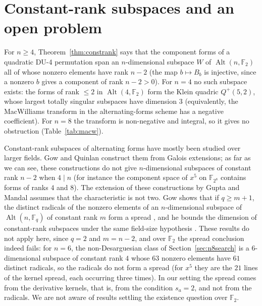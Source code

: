 \documentclass[11pt]{article}
\theoremstyle{definition}
\newcommand{\F}{\mathbb{F}}
\DeclareMathOperator{\Alt}{Alt}
\begin{document}
\section{Constant-rank subspaces and an open problem}\label{sec:constrank}
For $n\ge 4$, Theorem~\ref{thm:constrank} says that the component forms of a quadratic DU-4
permutation span an $n$-dimensional subspace $W$ of $\Alt(n,\F_2)$ all of whose nonzero
elements have rank $n-2$ (the map $b\mapsto B_b$ is injective, since a nonzero $b$ gives a
component of rank $n-2>0$). For $n=4$ no such subspace exists: the forms of rank $\le 2$ in
$\Alt(4,\F_2)$ form the Klein quadric $Q^+(5,2)$, whose largest totally singular subspaces
have dimension $3$ (equivalently, the MacWilliams transform in the alternating-forms scheme
\cite{DG75} has a negative coefficient). For $n=8$ the transform is non-negative and integral,
so it gives no obstruction (Table~\ref{tab:macw}).

Constant-rank subspaces of alternating forms have mostly been studied over larger fields.
Gow and Quinlan \cite{GQ09} construct them from Galois extensions; as far as we can see, these
constructions do not give $n$-dimensional subspaces of constant rank $n-2$ when $4\mid n$ (for
instance the component space of $x^5$ on $\F_{2^8}$ contains forms of ranks $4$ and $8$). The
extension of these constructions by Gupta and Mandal \cite{GM23} assumes that the characteristic
is not two. Gow
\cite{Gow18} shows that if $q\ge m+1$, the distinct radicals of the nonzero elements of an
$n$-dimensional subspace of $\Alt(n,\F_q)$ of constant rank $m$ form a spread
\cite[Theorem~13]{Gow18}, and he bounds the dimension of constant-rank subspaces under the same
field-size hypothesis \cite[Theorem~11]{Gow18}. These results do not apply here, since $q=2$ and
$m=n-2$, and over $\F_2$ the spread conclusion indeed fails: for $n=6$, the non-Desarguesian
class of Section~\ref{sec:n8search} is a $6$-dimensional subspace of constant rank $4$ whose $63$
nonzero elements have $61$ distinct radicals, so the radicals do not form a spread (for $x^5$
they are the $21$ lines of the kernel spread, each occurring three times). In our setting the
spread comes from the derivative kernels, that is, from the condition $s_a=2$, and not from the
radicals. We are not aware of results settling the existence question over $\F_2$.
\end{document}
